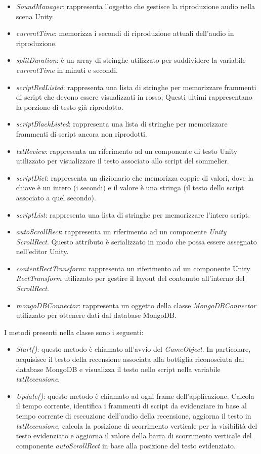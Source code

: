\begin{itemize}
    \item \textit{SoundManager}: rappresenta l'oggetto che gestisce la riproduzione audio nella scena Unity.
    \item \textit{currentTime}: memorizza i secondi di riproduzione attuali dell'audio in riproduzione. 
    \item \textit{splitDuration}: è un array di stringhe utilizzato per suddividere la variabile \textit{currentTime} in minuti e secondi.
    \item \textit{scriptRedListed}: rappresenta una lista di stringhe per memorizzare frammenti di script che devono essere visualizzati in rosso; Questi ultimi rappresentano la porzione di testo già riprodotto.
    \item \textit{scriptBlackListed}: rappresenta una lista di stringhe per memorizzare frammenti di script ancora non riprodotti.
    \item \textit{txtReview}: rappresenta un riferimento ad un componente di testo Unity utilizzato per visualizzare il testo associato allo script del sommelier.
    \item \textit{scriptDict}: rappresenta un dizionario che memorizza coppie di valori, dove la chiave è un intero (i secondi) e il valore è una stringa (il testo dello script associato a quel secondo).
    \item \textit{scriptList}: rappresenta una lista di stringhe per memorizzare l'intero script.
    \item \textit{autoScrollRect}: rappresenta un riferimento ad un componente \textit{Unity ScrollRect}. Questo attributo è serializzato in modo che possa essere assegnato nell'editor Unity. 
    \item \textit{contentRectTransform}: rappresenta un riferimento ad un componente Unity \textit{RectTransform} utilizzato per gestire il layout del contenuto all'interno del \textit{ScrollRect}.
    \item \textit{mongoDBConnector}: rappresenta un oggetto della classe \textit{MongoDBConnector} utilizzato per ottenere dati dal database MongoDB.
\end{itemize}

I metodi presenti nella classe sono i seguenti:

\begin{itemize}
    \item \textit{Start()}: questo metodo è chiamato all'avvio del \textit{GameObject}. In particolare, acquisisce il testo della recensione associata alla bottiglia riconosciuta dal database MongoDB e visualizza il testo nello script nella variabile \textit{txtRecensione}.
    \item \textit{Update()}: questo metodo è chiamato ad ogni frame dell'applicazione. Calcola il tempo corrente, identifica i frammenti di script da evidenziare in base al tempo corrente di esecuzione dell'audio della recensione, aggiorna il testo in \textit{txtRecensione}, calcola la posizione di scorrimento verticale per la visibilità del testo evidenziato e aggiorna il valore della barra di scorrimento verticale del componente \textit{autoScrollRect} in base alla posizione del testo evidenziato.
\end{itemize}

